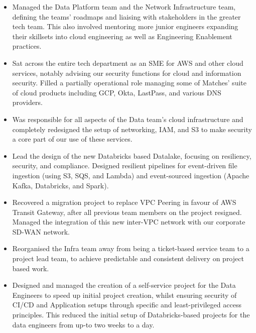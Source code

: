 \documentclass[10pt]{article} %
\begin{document}
{
  \begin{itemize}
      \item Managed the Data Platform team and the Network Infrastructure team, defining
            the teams' roadmaps and liaising with stakeholders in the greater tech team.
            This also involved mentoring more junior engineers expanding their skillsets
            into cloud engineering as well as Engineering Enablement practices.

      \item Sat across the entire tech department as an SME for AWS and other cloud services,
            notably advising our security functions for cloud and information security.
            Filled a partially operational role managing some of Matches'
            suite of cloud products including GCP, Okta, LastPass, and various DNS providers.

      \item Was responsible for all aspects of the Data team's cloud infrastructure and completely
            redesigned the setup of networking, IAM, and S3 to make security a core part of our use
            of these services.

      \item Lead the design of the new Databricks based Datalake, focusing on resiliency, security,
            and compliance. Designed resilient pipelines for event-driven file ingestion (using S3, SQS,
            and Lambda) and event-sourced ingestion (Apache Kafka, Databricks, and Spark).

      \item Recovered a migration project to replace VPC Peering in favour of AWS Transit Gateway,
            after all previous team members on the project resigned. Managed the integration of this
            new inter-VPC network with our corporate SD-WAN network.

      \item Reorganised the Infra team away from being a ticket-based service team to a project lead team,
            to achieve predictable and consistent delivery on project based work.

      \item Designed and managed the creation of a self-service project for the Data Engineers to speed up
            initial project creation, whilst ensuring security of CI/CD and Application setups through
            specific and least-privileged access principles. This reduced the initial setup of Databricks-based
            projects for the data engineers from up-to two weeks to a day.

  \end{itemize}
}
\end{document}
